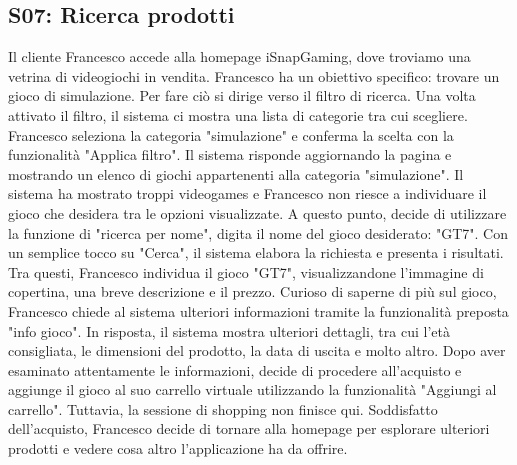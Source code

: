 \documentclass[12pt, a4paper, oneside]{book}
\begin{document}
    \subsection*{S07: Ricerca prodotti}
        Il cliente Francesco accede alla homepage iSnapGaming, dove troviamo una vetrina di videogiochi in vendita.
        Francesco ha un obiettivo specifico: trovare un gioco di simulazione. Per fare ciò si dirige verso il filtro di
        ricerca. Una volta attivato il filtro, il sistema ci mostra una lista di categorie tra cui scegliere. Francesco
        seleziona la categoria "simulazione" e conferma la scelta con la funzionalità "Applica filtro". Il sistema risponde
        aggiornando la pagina e mostrando un elenco di giochi appartenenti alla categoria "simulazione".
        Il sistema ha mostrato troppi videogames e Francesco non riesce a individuare il gioco che desidera tra le opzioni
        visualizzate. A questo punto, decide di utilizzare la funzione di "ricerca per nome", digita il nome del gioco
        desiderato: "GT7". Con un semplice tocco su "Cerca", il sistema elabora la richiesta e presenta i risultati.
        Tra questi, Francesco individua il gioco "GT7", visualizzandone l'immagine di copertina, una breve descrizione e il
        prezzo. Curioso di saperne di più sul gioco, Francesco chiede al sistema ulteriori informazioni tramite la funzionalità
        preposta "info gioco". In risposta, il sistema mostra ulteriori dettagli, tra cui l'età consigliata, le dimensioni
        del prodotto, la data di uscita e molto altro. Dopo aver esaminato attentamente le informazioni, decide di procedere
        all'acquisto e aggiunge il gioco al suo carrello virtuale utilizzando la funzionalità  "Aggiungi al carrello".
        Tuttavia, la sessione di shopping non finisce qui. Soddisfatto dell'acquisto, Francesco decide di tornare alla homepage
        per esplorare ulteriori prodotti e vedere cosa altro l'applicazione ha da offrire.
\end{document}
